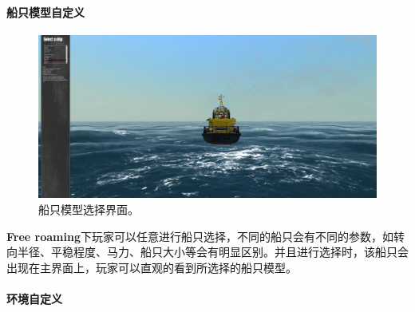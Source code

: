 \documentclass[letterpaper,10pt]{article}
\begin{document}
				\paragraph{船只模型自定义}
				
				\begin{figure}[htbp]
					\centering 
					\includegraphics[width=0.7\columnwidth]{picture/Select a ship}
					\caption{
						\label{fig: Select a ship} 
						船只模型选择界面。
					}	
				\end{figure}
	
				\textbf{Free roaming}下玩家可以任意进行船只选择，不同的船只会有不同的参数，如转向半径、平稳程度、马力、船只大小等会有明显区别。并且进行选择时，该船只会出现在主界面上，玩家可以直观的看到所选择的船只模型。
				
				\paragraph{环境自定义}
				
\end{document}
